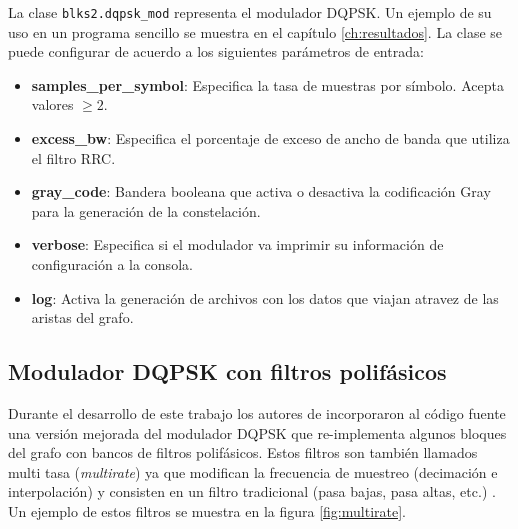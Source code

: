 La clase \verb|blks2.dqpsk_mod| representa el modulador DQPSK. Un ejemplo de su uso en un programa sencillo se muestra en el
cap\'itulo \ref{ch:resultados}. La clase se puede configurar de acuerdo a los siguientes par\'ametros de entrada:

\begin{itemize}
  \item \textbf{samples\_per\_symbol}: Especifica la tasa de muestras por s\'imbolo. Acepta valores $\geq 2$.
  \item \textbf{excess\_bw}: Especifica el porcentaje de exceso de ancho de banda que utiliza el filtro RRC.
  \item \textbf{gray\_code}: Bandera booleana que activa o desactiva la codificaci\'on Gray para la generaci\'on de la
  constelaci\'on.
  \item \textbf{verbose}: Especifica si el modulador va imprimir su informaci\'on de configuraci\'on a la consola.
  \item \textbf{log}: Activa la generaci\'on de archivos con los datos que viajan atravez de las aristas del grafo.
\end{itemize} 



\subsection{Modulador DQPSK con filtros polif\'asicos}
Durante el desarrollo de este trabajo los autores de \gnuradio incorporaron al c\'odigo fuente una
versi\'on mejorada del modulador DQPSK que re-implementa algunos bloques del grafo con bancos de
filtros polif\'asicos. Estos filtros son tambi\'en llamados multi tasa (\emph{multirate}) ya que
modifican la frecuencia de muestreo (decimaci\'on e interpolaci\'on) y consisten en un filtro
tradicional (pasa bajas, pasa altas, etc.) \cite{behrouz}. Un ejemplo de estos filtros se muestra en la figura
\ref{fig:multirate}.

